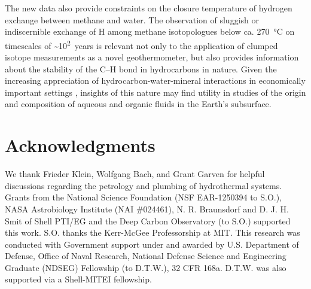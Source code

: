 The new data also provide constraints on the closure temperature of
hydrogen exchange between methane and water. The observation of sluggish
or indiscernible exchange of H among methane isotopologues below ca.
270~°C on timescales of \textasciitilde{}10\textsuperscript{2}~years is
relevant not only to the application of clumped isotope measurements as
a novel geothermometer, but also provides information about the
stability of the C--H bond in hydrocarbons in nature. Given the
increasing appreciation of hydrocarbon-water-mineral interactions in
economically important settings \parencite{Seewald_2003_N}, insights of this nature
may find utility in studies of the origin and composition of aqueous and
organic fluids in the Earth's subsurface.

\section*{Acknowledgments}\label{acknowledgments-1}

We thank Frieder Klein, Wolfgang Bach, and Grant Garven for helpful
discussions regarding the petrology and plumbing of hydrothermal
systems. Grants from the National Science Foundation (NSF EAR-1250394 to
S.O.), NASA Astrobiology Institute (NAI \#024461), N. R. Braunsdorf and D. J. H.
Smit of Shell PTI/EG and the Deep Carbon Observatory (to S.O.) supported
this work. S.O. thanks the Kerr-McGee Professorship at MIT. This
research was conducted with Government support under and awarded by U.S.
Department of Defense, Office of Naval Research, National Defense
Science and Engineering Graduate (NDSEG) Fellowship (to D.T.W.), 32 CFR
168a. D.T.W. was also supported via a Shell-MITEI fellowship.








